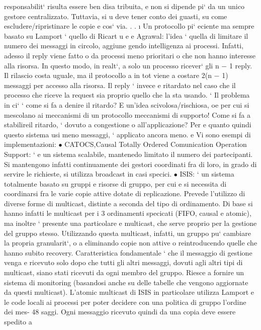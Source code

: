 \documentclass[a4paper,12pt]{article}
\begin{document}
responsabilit` risulta essere ben disa
tribuita, e non si dipende pi` da un unico gestore centralizzato. Tuttavia, si
u
deve tener conto dei guasti, su come escludere/ripristinare le copie e cos` via. . .
\i{}
Un protocollo pi` eciente ma sempre basato su Lamport ` quello di Ricart
u
e
e Agrawal: l'idea ` quella di limitare il numero dei messaggi in circolo, aggiune
gendo intelligenza ai processi. Infatti, adesso il reply viene fatto o da processi
meno prioritari o che non hanno interesse alla risorsa. In questo modo, in realt`,
a
solo un processo ricever` gli n $-$ 1 reply. Il rilascio costa uguale, ma il protocollo
a
in tot viene a costare 2(n $-$ 1) messaggi per accesso alla risorsa. Il reply ` invece
e
ritardato nel caso che il processo che riceve la request sia proprio quello che la
sta usando.
`
Il problema in ci` ` come si fa a denire il ritardo? E un'idea scivolosa/rischiosa,
oe
per cui si mescolano ai meccanismi di un protocollo meccanismi di supporto!
Come si fa a stabilireil ritardo, ` dovuto a congestione o all'applicazione? Per
e
quanto quindi questo sistema usi meno messaggi, ` applicato ancora meno.
e
Vi sono esempi di implementazioni:
$\bullet$ CATOCS,Causal Totally Ordered Comunication Operation Support: `
e
un sistema scalabile, mantenedo limitato il numero dei partecipanti. Si
mantengono infatti continuamente dei gestori coordinati fra di loro, in
grado di servire le richieste, si utilizza broadcast in casi specici.
$\bullet$ ISIS: ` un sistema totalmente basato su gruppi e risorse di gruppo, per cui
e
si necessita di coordinarsi fra le varie copie attive dotate di replicazione.
Prevede l'utilizzo di diverse forme di multicast, distinte a seconda del tipo
di ordinamento. Di base si hanno infatti le multicast per i 3 ordinamenti
specicati (FIFO, causal e atomic), ma inoltre ` presente una particolare
e
multicast, che serve proprio per la gestione del gruppo stesso. Utilizzando
questa multicast, infatti, un gruppo pu` cambiare la propria granularit`,
o
a
eliminando copie non attive o reintroducendo quelle che hanno subito recovery. Caratteristica fondamentale ` che il
messaggio di gestione venga
e
ricevuto solo dopo che tutti gli altri messaggi, dovuti agli altri tipi di multicast, siano stati ricevuti da ogni
membro del gruppo. Riesce a fornire
un sistema di monitoring (basandosi anche su delle tabelle che vengono
aggiornate da questi multicast).
L'atomic multicast di ISIS in particolare utilizza Lamport e le code locali
ai processi per poter decidere con una politica di gruppo l'ordine dei mes-
48
\newpage
saggi. Ogni messaggio ricevuto quindi da una copia deve essere spedito a
\end{document}
